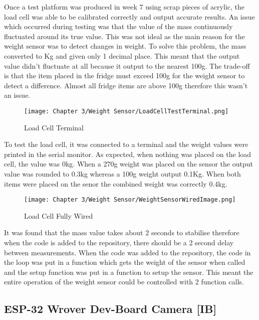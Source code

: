 Once a test platform was produced in week 7 using scrap pieces of acrylic, the load cell was able to be calibrated correctly and output accurate results.
An issue which occurred during testing was that the value of the mass continuously fluctuated around its true value.
This was not ideal as the main reason for the weight sensor was to detect changes in weight.
To solve this problem, the mass converted to Kg and given only 1 decimal place.
This meant that the output value didn't fluctuate at all because it output to the nearest 100g.
The trade-off is that the item placed in the fridge must exceed 100g for the weight sensor to detect a difference.
Almost all fridge items are above 100g therefore this wasn't an issue.

\begin{figure}[H]        
    \centering
    \texttt{[image: Chapter 3/Weight Sensor/LoadCellTestTerminal.png]}
    \caption{Load Cell Terminal}
    \label{fig:lcterminal}
\end{figure} 

To test the load cell, it was connected to a terminal and the weight values were printed in the serial monitor.
As expected, when nothing was placed on the load cell, the value was 0kg.
When a 270g weight was placed on the sensor the output value was rounded to 0.3kg whereas a 100g weight output 0.1Kg.
When both items were placed on the senor the combined weight was correctly 0.4kg.

\begin{figure}[H]        
    \centering
    \texttt{[image: Chapter 3/Weight Sensor/WeightSensorWiredImage.png]}
    \caption{Load Cell Fully Wired}
    \label{fig:lcwired}
\end{figure} 

It was found that the mass value takes about 2 seconds to stabilise therefore when the code is added to the repository, there should be a 2 second delay between measurements.
When the code was added to the repository, the code in the loop was put in a function which gets the weight of the sensor when called and the setup function was put in a function to setup the sensor.
This meant the entire operation of the weight sensor could be controlled with 2 function calls.

\subsection{ESP-32 Wrover Dev-Board Camera [IB]}

